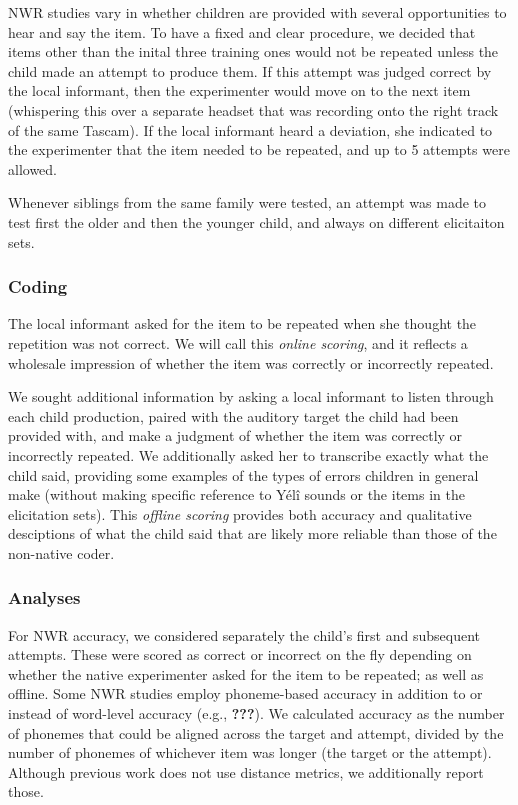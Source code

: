 \documentclass[english,,man,floatsintext]{apa6}
\begin{document}
NWR studies vary in whether children are provided with several opportunities to hear and say the item. To have a fixed and clear procedure, we decided that items other than the inital three training ones would not be repeated unless the child made an attempt to produce them. If this attempt was judged correct by the local informant, then the experimenter would move on to the next item (whispering this over a separate headset that was recording onto the right track of the same Tascam). If the local informant heard a deviation, she indicated to the experimenter that the item needed to be repeated, and up to 5 attempts were allowed.

Whenever siblings from the same family were tested, an attempt was made to test first the older and then the younger child, and always on different elicitaiton sets.

\hypertarget{coding}{%
\subsubsection{Coding}\label{coding}}

The local informant asked for the item to be repeated when she thought the repetition was not correct. We will call this \emph{online scoring}, and it reflects a wholesale impression of whether the item was correctly or incorrectly repeated.

We sought additional information by asking a local informant to listen through each child production, paired with the auditory target the child had been provided with, and make a judgment of whether the item was correctly or incorrectly repeated. We additionally asked her to transcribe exactly what the child said, providing some examples of the types of errors children in general make (without making specific reference to Yélî sounds or the items in the elicitation sets). This \emph{offline scoring} provides both accuracy and qualitative desciptions of what the child said that are likely more reliable than those of the non-native coder.

\hypertarget{analyses}{%
\subsubsection{Analyses}\label{analyses}}

For NWR accuracy, we considered separately the child's first and subsequent attempts. These were scored as correct or incorrect on the fly depending on whether the native experimenter asked for the item to be repeated; as well as offline. Some NWR studies employ phoneme-based accuracy in addition to or instead of word-level accuracy (e.g., {\textbf{???}}). We calculated accuracy as the number of phonemes that could be aligned across the target and attempt, divided by the number of phonemes of whichever item was longer (the target or the attempt). Although previous work does not use distance metrics, we additionally report those.
\end{document}
